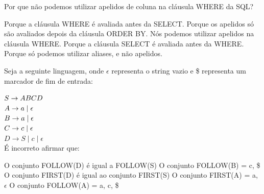 \documentclass[12pt, addpoints]{exam}
\begin{document}
\begin{questions}
Por que não podemos utilizar apelidos de coluna na cláusula WHERE da SQL?
\begin{choices}
\choice Porque a cláusula WHERE é avaliada antes da SELECT.
\choice Porque os apelidos só são avaliados depois da cláusula ORDER BY.
\choice Nós podemos utilizar apelidos na cláusula WHERE.
\choice Porque a cláusula SELECT é avaliada antes da WHERE.
\choice Porque só podemos utilizar aliases, e não apelidos.
\end{choices}

\question

Seja a seguinte linguagem, onde \(\epsilon\) representa o string vazio e \$ representa um marcador de fim de entrada:



$S \rightarrow ABCD \\$\\

$A \rightarrow a \mid \epsilon \\$\\

$B \rightarrow a \mid \epsilon \\$\\

$C \rightarrow c \mid \epsilon \\$\\

$D \rightarrow S \mid c \mid \epsilon$\\



É incorreto afirmar que:
\begin{choices}
\choice O conjunto FOLLOW(D) é igual a FOLLOW(S)
\choice O conjunto FOLLOW(B) = c, \$
\choice O conjunto FIRST(D) é igual ao conjunto FIRST(S)
\choice O conjunto FIRST(A) = a, \(\epsilon\)
\choice O conjunto FOLLOW(A) = a, c, \$
\end{choices}



    \end{questions}
    
\end{document}
